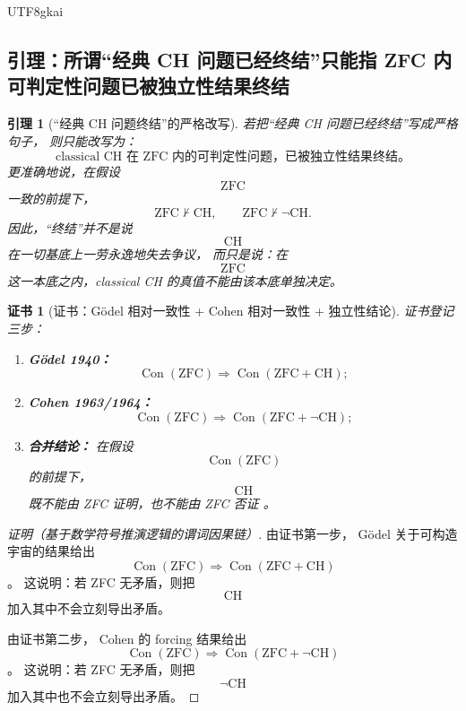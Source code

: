 \documentclass[12pt]{article}
\newtheorem{lemma}{引理}[section]
\newtheorem{Certificate}{证书}[section]
\newcommand{\Con}{\operatorname{Con}}
\begin{document}
\begin{CJK*}{UTF8}{gkai}
\subsection{引理：所谓“经典 CH 问题已经终结”只能指 ZFC 内可判定性问题已被独立性结果终结}
\label{subsec:tex41-ch-zfc-lemma}

\begin{lemma}[“经典 CH 问题终结”的严格改写]
\label{lem:tex41-ch-zfc-independence}
若把“经典 CH 问题已经终结”写成严格句子，
则只能改写为：
\[
\boxed{
  \text{classical CH 在 ZFC 内的可判定性问题，已被独立性结果终结。}
}
\]
更准确地说，在假设
\[
  \mathrm{ZFC}
\]
一致的前提下，
\[
  \mathrm{ZFC}\nvdash \mathrm{CH},
  \qquad
  \mathrm{ZFC}\nvdash \neg\mathrm{CH}.
\]
因此，“终结”并不是说
\[
  \mathrm{CH}
\]
在一切基底上一劳永逸地失去争议，
而只是说：在
\[
  \mathrm{ZFC}
\]
这一本底之内，classical CH 的真值不能由该本底单独决定。
\end{lemma}

\begin{Certificate}[证书：Gödel 相对一致性 + Cohen 相对一致性 + 独立性结论]
\label{cert:tex41-ch-zfc-independence}
证书登记三步：
\begin{enumerate}
  \item \textbf{Gödel 1940：}
  \[
    \Con(\mathrm{ZFC})
    \Rightarrow
    \Con(\mathrm{ZFC}+\mathrm{CH});
  \]
  \item \textbf{Cohen 1963/1964：}
  \[
    \Con(\mathrm{ZFC})
    \Rightarrow
    \Con(\mathrm{ZFC}+\neg\mathrm{CH});
  \]
  \item \textbf{合并结论：}
  在假设
  \[
    \Con(\mathrm{ZFC})
  \]
  的前提下，
  \[
    \mathrm{CH}
  \]
  既不能由 ZFC 证明，也不能由 ZFC 否证
  \cite{Godel1940CH,Cohen1963CHI,Cohen1964CHII,Jech2003SetTheory}。
\end{enumerate}
\end{Certificate}

\begin{proof}[证明（基于数学符号推演逻辑的谓词因果链）]
由证书第一步，
Gödel 关于可构造宇宙的结果给出
\[
  \Con(\mathrm{ZFC})
  \Rightarrow
  \Con(\mathrm{ZFC}+\mathrm{CH})
\]
\cite{Godel1940CH,Jech2003SetTheory}。
这说明：若 ZFC 无矛盾，则把
\[
  \mathrm{CH}
\]
加入其中不会立刻导出矛盾。

由证书第二步，
Cohen 的 forcing 结果给出
\[
  \Con(\mathrm{ZFC})
  \Rightarrow
  \Con(\mathrm{ZFC}+\neg\mathrm{CH})
\]
\cite{Cohen1963CHI,Cohen1964CHII,Jech2003SetTheory}。
这说明：若 ZFC 无矛盾，则把
\[
  \neg\mathrm{CH}
\]
加入其中也不会立刻导出矛盾。


\end{proof}
\end{CJK*}
\end{document}
